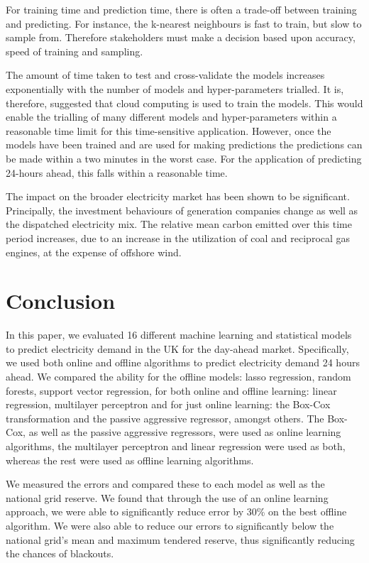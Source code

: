\documentclass[final,3p,times,twocolumn,numbers]{elsarticle}
\begin{document}
For training time and prediction time, there is often a trade-off between training and predicting. For instance, the k-nearest neighbours is fast to train, but slow to sample from. Therefore stakeholders must make a decision based upon accuracy, speed of training and sampling. 

The amount of time taken to test and cross-validate the models increases exponentially with the number of models and hyper-parameters trialled. It is, therefore, suggested that cloud computing is used to train the models. This would enable the trialling of many different models and hyper-parameters within a reasonable time limit for this time-sensitive application. However, once the models have been trained and are used for making predictions the predictions can be made within a two minutes in the worst case. For the application of predicting 24-hours ahead, this falls within a reasonable time.

The impact on the broader electricity market has been shown to be significant. Principally, the investment behaviours of generation companies change as well as the dispatched electricity mix. The relative mean carbon emitted over this time period increases, due to an increase in the utilization of coal and reciprocal gas engines, at the expense of offshore wind.




\section{Conclusion}
\label{sec:conclusion}

In this paper, we evaluated 16 different machine learning and statistical models to predict electricity demand in the UK for the day-ahead market. Specifically, we used both online and offline algorithms to predict electricity demand 24 hours ahead. We compared the ability for the offline models: lasso regression, random forests, support vector regression, for both online and offline learning: linear regression, multilayer perceptron and for just online learning: the Box-Cox transformation and the passive aggressive regressor, amongst others. The Box-Cox, as well as the passive aggressive regressors, were used as online learning algorithms, the multilayer perceptron and linear regression were used as both, whereas the rest were used as offline learning algorithms.

We measured the errors and compared these to each model as well as the national grid reserve. We found that through the use of an online learning approach, we were able to significantly reduce error by 30\% on the best offline algorithm.  We were also able to reduce our errors to significantly below the national grid's mean and maximum tendered reserve, thus significantly reducing the chances of blackouts.
\end{document}

